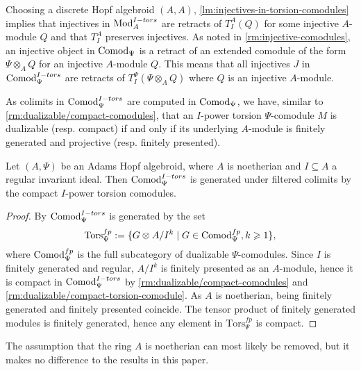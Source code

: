 \begin{remark}
    \label{rm:injectives-in-torsion-modules}
    Choosing a discrete Hopf algebroid $(A,A)$, \cref{lm:injectives-in-torsion-comodules} implies that injectives in $\mathrm{Mod}_A^{I-tors}$ are retracts of $T_I^A(Q)$ for some injective $A$-module $Q$ and that $T_I^A$ preserves injectives. As noted in \cref{rm:injective-comodules}, an injective object in $\mathrm{Comod}_\Psi$ is a retract of an extended comodule of the form $\Psi\otimes_A Q$ for an injective $A$-module $Q$. This means that all injectives $J$ in $\mathrm{Comod}_\Psi^{I-tors}$ are retracts of $T_I^\Psi(\Psi\otimes_A Q)$ where $Q$ is an injective $A$-module. 
\end{remark}

\begin{remark}
    \label{rm:dualizable/compact-torsion-comodule}
    As colimits in $\mathrm{Comod}_\Psi^{I-tors}$ are computed in $\mathrm{Comod}_\Psi$, we have, similar to \cref{rm:dualizable/compact-comodules}, that an $I$-power torsion $\Psi$-comodule $M$ is dualizable (resp. compact) if and only if its underlying $A$-module is finitely generated and projective (resp. finitely presented). 
\end{remark}

\begin{lemma}
    \label{lm:torsion-comodules-generated-by-compacts}
    Let $(A,\Psi)$ be an Adams Hopf algebroid, where $A$ is noetherian and $I\subseteq A$ a regular invariant ideal. Then $\mathrm{Comod}_\Psi^{I-tors}$ is generated under filtered colimits by the compact $I$-power torsion comodules. 
\end{lemma}
\begin{proof}
    By \cite[3.4]{barthel-heard-valenzuela_2020} $\mathrm{Comod}_\Psi^{I-tors}$ is generated by the set 
    $$\mathrm{Tors}_\Psi^{fp}:=\{G\otimes A/I^k \mid G \in \mathrm{Comod}_\Psi^{fp}, k\geqslant 1\},$$
    where $\mathrm{Comod}_\Psi^{fp}$ is the full subcategory of dualizable $\Psi$-comodules. Since $I$ is finitely generated and regular, $A/I^k$ is finitely presented as an $A$-module, hence it is compact in $\mathrm{Comod}_\Psi^{I-tors}$ by \cref{rm:dualizable/compact-comodules} and \cref{rm:dualizable/compact-torsion-comodule}. As $A$ is noetherian, being finitely generated and finitely presented coincide. The tensor product of finitely generated modules is finitely generated, hence any element in $\mathrm{Tors}_\Psi^{fp}$ is compact. 
\end{proof}

\begin{remark}
    The assumption that the ring $A$ is noetherian can most likely be removed, but it makes no difference to the results in this paper.  
\end{remark}


